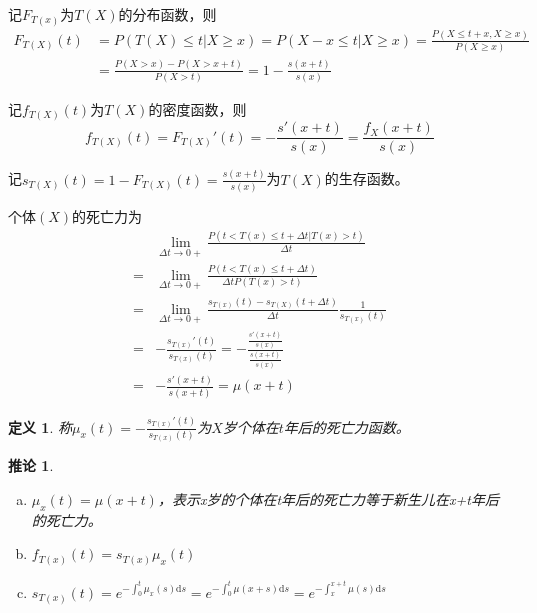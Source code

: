 \documentclass[12pt, a4paper, oneside]{ctexbook}
\newtheorem{definition}[theorem]{定义}
\newtheorem{corollary}[theorem]{推论}
\begin{document}
记$F_{T(x)}$为$T(X)$的分布函数，则
$$
    \begin{aligned}
        F_{T(X)}(t) & = P(T(X) \leq t|X \geq x) = P(X- x \leq t | X \geq x) = \frac{P(X \leq t + x, X \geq x)}{P(X \geq x)} \\
                    & = \frac{P(X > x) - P(X > x + t)}{P(X > t)} = 1 - \frac{s(x+t)}{s(x)}
    \end{aligned}
$$

记$f_{T(X)}(t)$为$T(X)$的密度函数，则
\begin{equation*}
    f_{T(X)}(t) = F_{T(X)}'(t) = -\frac{s'(x+t)}{s(x)} = \frac{f_X(x+t)}{s(x)}
\end{equation*}

记$s_{T(X)}(t) = 1 - F_{T(X)}(t) = \frac{s(x+t)}{s(x)}$为$T(X)$的生存函数。

个体$(X)$的死亡力为
\begin{equation*}
    \begin{aligned}
          & \lim_{\Delta t\to0+}\frac{P(t<T(x)\leqslant t+\Delta t|T(x)>t)}{\Delta t}                      \\
        = & \lim_{\Delta t\to0+}\frac{P(t<T(x)\leqslant t+\Delta t)}{\Delta tP(T(x)>t)}                    \\
        = & \lim_{\Delta t\to0+}\frac{s_{T(x)}(t) - s_{T(X)}(t + \Delta t)}{\Delta t}\frac{1}{s_{T(x)}(t)} \\
        = & - \frac{s_{T(x)}'(t)}{s_{T(x)}(t)} = - \frac{\frac{s'(x+t)}{s(x)}}{\frac{s(x+t)}{s(x)}}        \\
        = & -\frac{s'(x+t)}{s(x+t)} = \mu(x+t)
    \end{aligned}
\end{equation*}
\begin{definition}
    称$\mu_x(t) = -\frac{s_{T(x)}'(t)}{s_{T(x)}(t)}$为$X$岁个体在$t$年后的死亡力函数。
\end{definition}

\begin{corollary}
    \begin{enumerate}[a.]
        \item $\mu_x(t) = \mu(x+t)$，表示x岁的个体在t年后的死亡力等于新生儿在x+t年后的死亡力。
        \item $f_{T(x)}(t) = s_{T(x)}\mu_x(t)$
        \item $s_{T(x)}(t) = e^{-\int_0^t\mu_x(s)\mathrm{d}s} = e^{-\int_0^t\mu(x+s)\mathrm{d}s} = e^{-\int_x^{x+t}\mu(s)\mathrm{d}s}$
    \end{enumerate}
\end{corollary}
\end{document}
